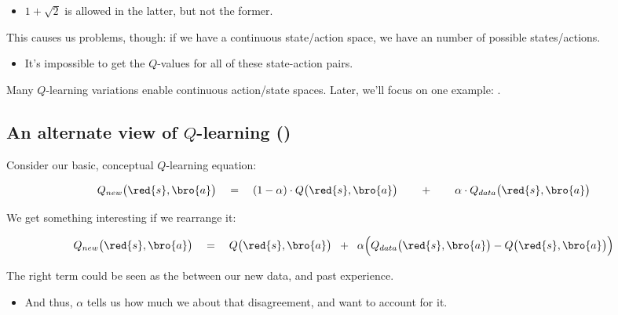         \begin{itemize}
            \item $1+\sqrt{2}$ is allowed in the latter, but not the former.
        \end{itemize}

        This causes us problems, though: if we have a continuous state/action space, we have an  number of possible states/actions.

        \begin{itemize}
            \item It's impossible to get the $Q$-values for all of these state-action pairs.
        \end{itemize}

        Many $Q$-learning variations enable continuous action/state spaces. Later, we'll focus on one example: .




    \phantom{}

    \subsection{An alternate view of $Q$-learning ()}

        Consider our basic, conceptual $Q$-learning equation:

        \begin{equation}
            Q_{new}\big(\red{s},\bro{a} \big) \quad=\quad  
            (1-\alpha) \cdot Q\big(\red{s},\bro{a} \big)
            \qquad+\qquad 
            \alpha \cdot Q_{data}\big(\red{s},\bro{a} \big)
        \end{equation}

        We get something interesting if we rearrange it:

        \begin{equation}
            Q_{new}\big(\red{s},\bro{a} \big) \quad=\quad  
            Q\big(\red{s},\bro{a} \big)
            \;\;+\;\; 
            \alpha
            \Big( 
                Q_{data}\big(\red{s},\bro{a} \big) - Q\big(\red{s},\bro{a} \big)   
            \Big)
        \end{equation}

        The right term could be seen as the  between our new data, and past experience.
        

        \begin{itemize}
            \item And thus, $\alpha$ tells us how much we  about that disagreement, and want to account for it.
        \end{itemize}

